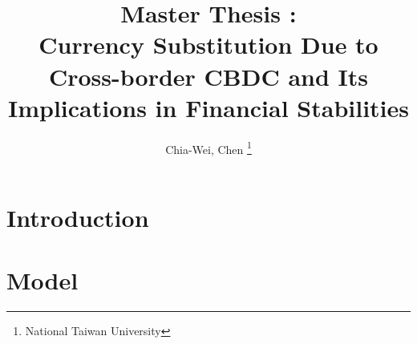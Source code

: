 \documentclass{article}
\title{Master Thesis : \\ 
Currency Substitution Due to Cross-border CBDC and Its Implications in Financial Stabilities}
\author{Chia-Wei, Chen \thanks{National Taiwan University}}
\theoremstyle{definition}
\begin{document}
    \maketitle
    \begin{abstract}
        
    \end{abstract}

    \section{Introduction}
    \section{Model}
     


    
    
\end{document}

